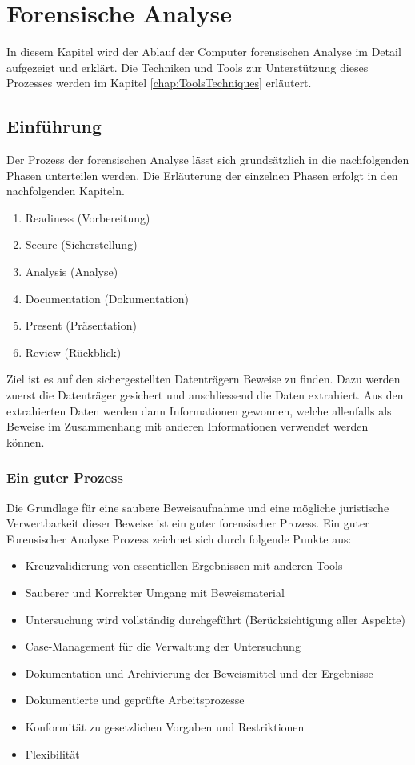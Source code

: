 \chapter{Forensische Analyse} \label{chap:ForensischeAnalyse}
In diesem Kapitel wird der Ablauf der Computer forensischen Analyse im Detail aufgezeigt und erklärt. Die Techniken und Tools zur Unterstützung dieses Prozesses werden im Kapitel \ref{chap:ToolsTechniques}  erläutert.

\section{Einführung}
Der Prozess der forensischen Analyse lässt sich grundsätzlich in die nachfolgenden Phasen unterteilen werden. Die Erläuterung der einzelnen Phasen erfolgt in den nachfolgenden Kapiteln.

\begin{enumerate}
\item Readiness (Vorbereitung)
\item Secure (Sicherstellung)
\item Analysis (Analyse)
\item Documentation (Dokumentation)
\item Present (Präsentation)
\item Review (Rückblick)
\end{enumerate}

Ziel ist es auf den sichergestellten Datenträgern Beweise zu finden. Dazu werden zuerst die Datenträger gesichert und anschliessend die Daten extrahiert. Aus den extrahierten Daten werden dann Informationen gewonnen, welche allenfalls als Beweise im Zusammenhang mit anderen Informationen verwendet werden können.


\subsection{Ein guter Prozess}
Die Grundlage für eine saubere Beweisaufnahme und eine mögliche juristische Verwertbarkeit dieser Beweise ist ein guter forensischer Prozess. Ein guter Forensischer Analyse Prozess zeichnet sich durch folgende Punkte aus:

\begin{itemize}
\item Kreuzvalidierung von essentiellen Ergebnissen mit anderen Tools
\item Sauberer und Korrekter Umgang mit Beweismaterial
\item Untersuchung wird vollständig durchgeführt (Berücksichtigung aller Aspekte)
\item Case-Management für die Verwaltung der Untersuchung
\item Dokumentation und Archivierung der Beweismittel und der Ergebnisse
\item Dokumentierte und geprüfte Arbeitsprozesse
\item Konformität zu gesetzlichen Vorgaben und Restriktionen
\item Flexibilität
\end{itemize}


